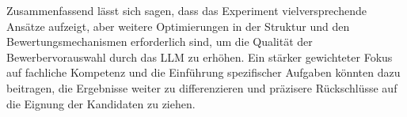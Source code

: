Zusammenfassend lässt sich sagen, dass das Experiment vielversprechende Ansätze aufzeigt, aber weitere Optimierungen in der Struktur und den Bewertungsmechanismen erforderlich sind, um die Qualität der Bewerbervorauswahl durch das \ac{LLM} zu erhöhen. Ein stärker gewichteter Fokus auf fachliche Kompetenz und die Einführung spezifischer Aufgaben könnten dazu beitragen, die Ergebnisse weiter zu differenzieren und präzisere Rückschlüsse auf die Eignung der Kandidaten zu ziehen.